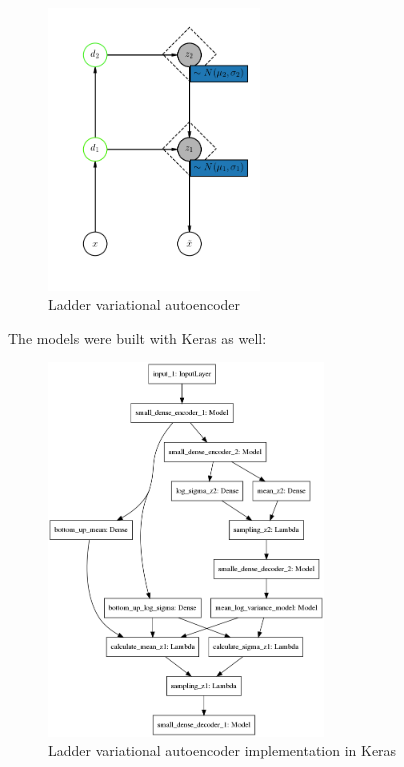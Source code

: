 \documentclass[11pt, english]{article}
\begin{document}
\begin{figure}[H]
    \centering
    \includegraphics[width=0.5\textwidth]{lvae.png}
    \caption{Ladder variational autoencoder}
\end{figure}

\vspace{3mm}

\par The models were built with Keras \cite{chollet2015keras} as well:

\vspace{3mm}

\begin{figure}[H]
    \centering
    \includegraphics[width=0.65\textwidth]{lvae_keras.png}
    \caption{Ladder variational autoencoder implementation in Keras}
    \label{fig:keras_lvae}
\end{figure}
\end{document}
